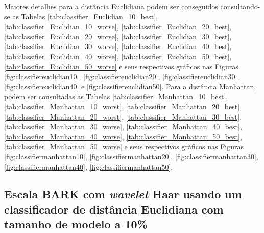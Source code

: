 		\par Maiores detalhes para a distância Euclidiana podem ser conseguidos consultando-se as Tabelas \ref{tab:classifier_Euclidian_10_best}, \ref{tab:classifier_Euclidian_10_worse},
		\ref{tab:classifier_Euclidian_20_best}, \ref{tab:classifier_Euclidian_20_worse}, 
		\ref{tab:classifier_Euclidian_30_best}, \ref{tab:classifier_Euclidian_30_worse}, 
		\ref{tab:classifier_Euclidian_40_best}, \ref{tab:classifier_Euclidian_40_worse}, 
		\ref{tab:classifier_Euclidian_50_best}, \ref{tab:classifier_Euclidian_50_worse}
		e seus respectivos gráficos nas Figuras \ref{fig:classifiereuclidian10}, \ref{fig:classifiereuclidian20}, \ref{fig:classifiereuclidian30}, \ref{fig:classifiereuclidian40} e \ref{fig:classifiereuclidian50}. Para a distância Manhattan, podem ser consultadas as Tabelas 	\ref{tab:classifier_Manhattan_10_best}, \ref{tab:classifier_Manhattan_10_worst}, 
		\ref{tab:classifier_Manhattan_20_best}, \ref{tab:classifier_Manhattan_20_worst}, 
		\ref{tab:classifier_Manhattan_30_best}, \ref{tab:classifier_Manhattan_30_worse}, 
		\ref{tab:classifier_Manhattan_40_best}, \ref{tab:classifier_Manhattan_40_worse}, 
		\ref{tab:classifier_Manhattan_50_best}, \ref{tab:classifier_Manhattan_50_worse} 
		e seus respectivos gráficos nas Figuras		 
		\ref{fig:classifiermanhattan10}, \ref{fig:classifiermanhattan20}, 	 \ref{fig:classifiermanhattan30}, \ref{fig:classifiermanhattan40},  \ref{fig:classifiermanhattan50}.\\
		
		
		
		\newpage
		\subsection{Escala BARK com \textit{wavelet} Haar usando um classificador de distância Euclidiana com tamanho de modelo a 10\%}

			
	
